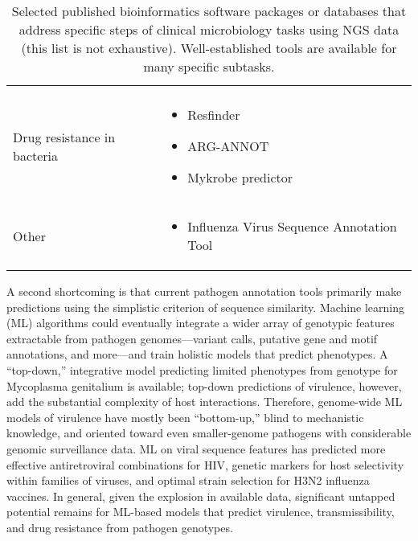 \begin{table}[ht]
\begin{tabular}{l l}
\begin{minipage}[t]{5cm}
\begin{itemize}[noitemsep]
      \end{itemize}
      \smallskip
    \end{minipage}
    \\
    \-\tabindent Drug resistance in bacteria &
    \begin{minipage}[t]{5cm}
      \raggedright
      \begin{itemize}[noitemsep]
      \item Resfinder
      \item ARG-ANNOT
      \item Mykrobe predictor
      \end{itemize}
      \smallskip
    \end{minipage}
    \\
    \-\tabindent Other &
    \begin{minipage}[t]{5cm}
      \raggedright
      \begin{itemize}[noitemsep]
      \item Influenza Virus Sequence Annotation Tool
      \end{itemize}
      \smallskip
    \end{minipage}
    \\
    \bottomrule
  \end{tabular}
  \caption[Bioinformatics tools for infectious diseases]{Selected published bioinformatics software packages or databases that address specific steps of clinical microbiology tasks using NGS data (this list is not exhaustive). Well-established tools are available for many specific subtasks.}
  \label{tab:id_bioinf_tools}
\end{table}

A second shortcoming is that current pathogen annotation tools primarily make predictions using the simplistic criterion of sequence similarity. Machine learning (ML) algorithms could eventually integrate a wider array of genotypic features extractable from pathogen genomes—variant calls, putative gene and motif annotations, and more—and train holistic models that predict phenotypes. A “top-down,” integrative model predicting limited phenotypes from genotype for Mycoplasma genitalium is available;\autocite{Karr2012} top-down predictions of virulence, however, add the substantial complexity of host interactions. Therefore, genome-wide ML models of virulence have mostly been “bottom-up,” blind to mechanistic knowledge, and oriented toward even smaller-genome pathogens with considerable genomic surveillance data. ML on viral sequence features has predicted more effective antiretroviral combinations for HIV,\autocite{Lengauer2006,Zazzi2012} genetic markers for host selectivity within families of viruses,\autocite{Raj2011a} and optimal strain selection for H3N2 influenza vaccines.\autocite{Luksza2014} In general, given the explosion in available data, significant untapped potential remains for ML-based models that predict virulence, transmissibility, and drug resistance from pathogen genotypes. 

